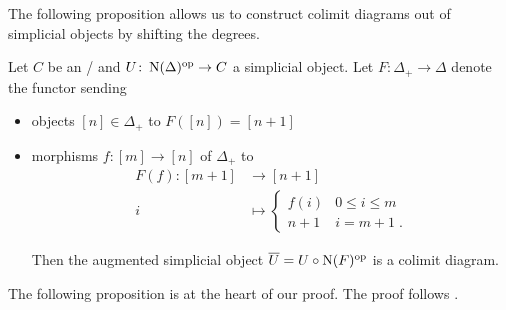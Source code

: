 The following proposition allows us to construct colimit diagrams out of simplicial objects by shifting the degrees.
\begin{prop}\label{prop:shiftIsColimDiam}
    Let $C$ be an \inftycat/ and $U\colon\operatorname{N}(\Delta)^{\operatorname{op}}\to C$ a simplicial object.
    Let $F\colon\Delta_+\to\Delta$ denote the functor sending 
    \begin{itemize}
        \item objects $[n]\in\Delta_+$ to $F([n])=[n+1]$
        \item morphisms $f\colon [m]\to[n]$ of $\Delta_+$ to 
        \begin{align*}
            F(f)\colon [m+1]&\to[n+1]\\
            i&\mapsto
            \begin{cases}
                f(i) & 0\leq i\leq m\\
                n+1 & i=m+1\;.
            \end{cases}
        \end{align*}
        
        Then the augmented simplicial object $\overline{U}=U\circ\operatorname{N}(F)^{\operatorname{op}}$ is a colimit diagram.
    \end{itemize}
    \begin{reference}
        \cite[Lemma 6.1.3.17 (1)]{HTT}
    \end{reference}
\end{prop}
The following proposition is at the heart of our proof. 
The proof follows \cite[pp. 29-30]{toposes_and_htpy_toposes}.
